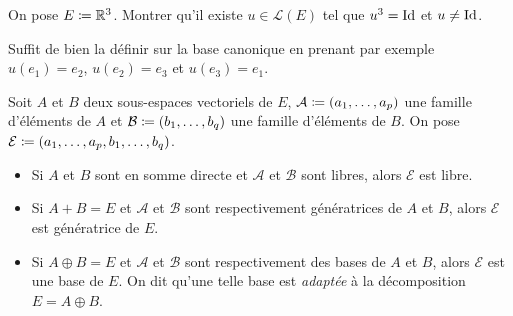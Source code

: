 \documentclass{magnolia}
\begin{document}

\begin{exoUnique}
\exo On pose $E\coloneqq\mathbb{R}^3$. Montrer qu'il existe $u\in\mathcal{L}(E)$ tel que
  $u^3=\operatorname{Id}$ et $u\neq \operatorname{Id}$.
  \begin{sol}
  Suffit de bien la définir sur la base canonique en prenant par exemple $u(e_1)=e_2$, $u(e_2)=e_3$ et $u(e_3)=e_1$.
  \end{sol}
\end{exoUnique}

\begin{proposition}
Soit $A$ et $B$ deux sous-espaces vectoriels de $E$, $\mathcal{A}\coloneqq(a_1,\ldots,a_p)$ une famille d'éléments de $A$ et
$\mathcal{B}\coloneqq(b_1,\ldots,b_q)$ une famille d'éléments de $B$. On pose $\mathcal{E}\coloneqq(a_1,\ldots,a_p,b_1,\ldots,b_q)$.
\begin{itemize}
\item Si $A$ et $B$ sont en somme directe et $\mathcal{A}$ et $\mathcal{B}$ sont libres, alors $\mathcal{E}$ est libre.
\item Si $A+B=E$ et $\mathcal{A}$ et $\mathcal{B}$ sont respectivement génératrices de $A$ et $B$, alors
  $\mathcal{E}$ est génératrice de $E$.
\item Si $A\oplus B=E$ et $\mathcal{A}$ et $\mathcal{B}$ sont respectivement des bases de $A$ et $B$, alors
  $\mathcal{E}$ est une base de $E$. On dit qu'une telle base est \emph{adaptée} à la
  décomposition $E=A\oplus B$.
\end{itemize}
\end{proposition}
\end{document}
